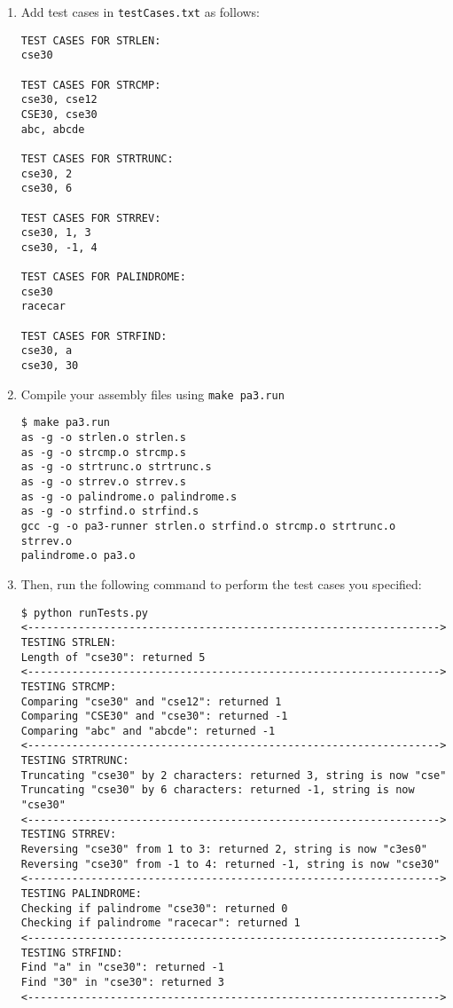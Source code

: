 \documentclass{article}
\begin{document}
\begin{enumerate}
\item  Add test cases in {\tt testCases.txt} as follows:

\begin{verbatim}
TEST CASES FOR STRLEN:
cse30

TEST CASES FOR STRCMP:
cse30, cse12
CSE30, cse30
abc, abcde

TEST CASES FOR STRTRUNC:
cse30, 2
cse30, 6

TEST CASES FOR STRREV:
cse30, 1, 3
cse30, -1, 4

TEST CASES FOR PALINDROME:
cse30
racecar

TEST CASES FOR STRFIND:
cse30, a
cse30, 30
\end{verbatim}

\item Compile your assembly files using {\tt make pa3.run}
\begin{verbatim}
$ make pa3.run
as -g -o strlen.o strlen.s
as -g -o strcmp.o strcmp.s
as -g -o strtrunc.o strtrunc.s
as -g -o strrev.o strrev.s
as -g -o palindrome.o palindrome.s
as -g -o strfind.o strfind.s
gcc -g -o pa3-runner strlen.o strfind.o strcmp.o strtrunc.o strrev.o 
palindrome.o pa3.o 
\end{verbatim}
\item Then, run the following command to perform the test cases you specified:
\begin{verbatim}
$ python runTests.py 
<----------------------------------------------------------------->
TESTING STRLEN:
Length of "cse30": returned 5
<----------------------------------------------------------------->
TESTING STRCMP:
Comparing "cse30" and "cse12": returned 1
Comparing "CSE30" and "cse30": returned -1
Comparing "abc" and "abcde": returned -1
<----------------------------------------------------------------->
TESTING STRTRUNC:
Truncating "cse30" by 2 characters: returned 3, string is now "cse"
Truncating "cse30" by 6 characters: returned -1, string is now "cse30"
<----------------------------------------------------------------->
TESTING STRREV:
Reversing "cse30" from 1 to 3: returned 2, string is now "c3es0"
Reversing "cse30" from -1 to 4: returned -1, string is now "cse30"
<----------------------------------------------------------------->
TESTING PALINDROME:
Checking if palindrome "cse30": returned 0
Checking if palindrome "racecar": returned 1
<----------------------------------------------------------------->
TESTING STRFIND:
Find "a" in "cse30": returned -1
Find "30" in "cse30": returned 3
<----------------------------------------------------------------->
\end{verbatim}
\end{enumerate}
\end{document}

